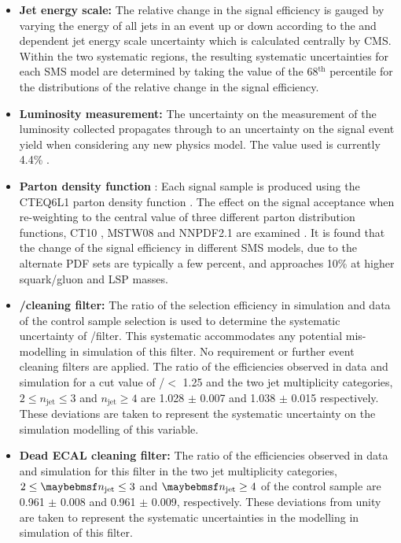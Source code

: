 \begin{itemize}
\item[]\textbf{Jet energy scale:} 
The relative change in the signal efficiency is gauged by varying the energy of all jets in an event up or down according to the \pt and \eta dependent jet energy scale uncertainty which is calculated centrally by \ac{CMS}. Within the two systematic regions, the resulting systematic uncertainties for each \ac{SMS} model are determined by taking the value of the 68$^{\text{th}}$ percentile for the distributions of the relative change in the signal efficiency.
\item[]\textbf{Luminosity measurement:} 
The uncertainty on the measurement of the luminosity collected propagates through to an uncertainty on the signal event yield when considering any new physics model. The value used is currently 4.4\% \cite{CMS-PAS-LUM-12-001}.
\item[]\textbf{Parton density function} :
Each signal sample is produced using the CTEQ6L1 parton density function \cite{Pumplin:2002vw}. The effect on the signal acceptance when re-weighting to the central value of three different parton distribution functions, CT10 \cite{Guzzi:2011sv}, MSTW08 \cite{Martin:2009iq} and NNPDF2.1 \cite{Cerutti:2011au} are examined \cite{Botje:2011sn}. It is found that the change of the signal efficiency in different \ac{SMS} models, due to the alternate \acf{PDF} sets are typically a few percent, and approaches 10\% at higher squark/gluon and \ac{LSP} masses.
\item[]\textbf{\mht/\met cleaning filter:} 
The ratio of the selection efficiency in simulation and data of the \mupjets control sample selection is used to determine the systematic uncertainty of \mht/\met filter. This systematic accommodates any potential mis-modelling in simulation of this filter. No \alphat requirement or further event cleaning filters are applied. The ratio of the efficiencies observed in data and simulation for a cut value of \mht/\met $<$ 1.25 and the two jet multiplicity categories, $2 \leq n_{\text{jet}} \leq 3$ and $n_{\text{jet}} \geq 4$ are 1.028 $\pm$ 0.007 and 1.038 $\pm$ 0.015 respectively. These deviations are taken to represent the systematic uncertainty on the simulation modelling of this variable.
\item[]\textbf{Dead ECAL cleaning filter:} 
The ratio of the efficiencies observed in data and simulation for this filter in the two jet multiplicity categories, $2 \leq \njet \leq 3$ and $\njet \geq 4$ of the  \mupjets control sample are 0.961 $\pm$ 0.008 and 0.961 $\pm$ 0.009, respectively. These deviations from unity are taken to represent the systematic uncertainties in the modelling in simulation of this filter.

\end{itemize}
